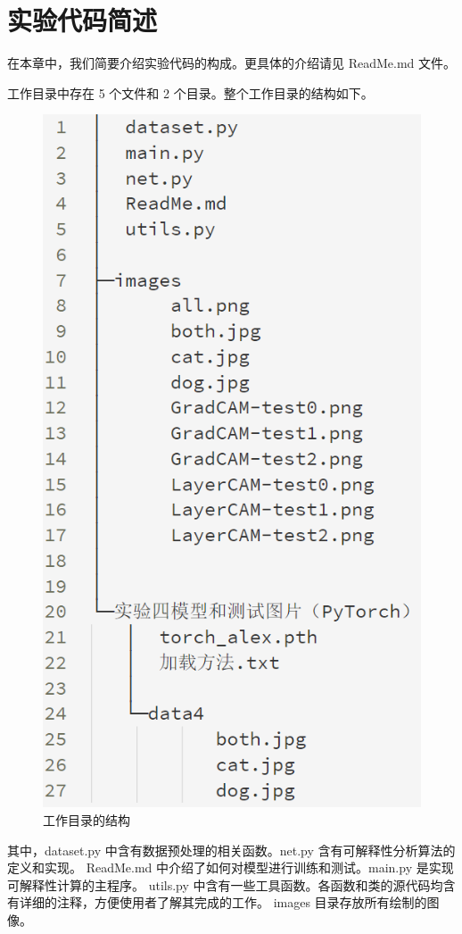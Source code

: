 \documentclass[supercite]{Experimental_Report}
\theoremstyle{definition}
\begin{document}
\section{实验代码简述}
在本章中，我们简要介绍实验代码的构成。更具体的介绍请见 ReadMe.md 文件。

工作目录中存在 5 个文件和 2 个目录。整个工作目录的结构如下。
\begin{figure}[H]
	\begin{center}
		\includegraphics[scale=0.5]{../images/tree.png}
		\caption{工作目录的结构}
	\end{center}
\end{figure}

其中，dataset.py 中含有数据预处理的相关函数。net.py 含有可解释性分析算法的定义和实现。
ReadMe.md 中介绍了如何对模型进行训练和测试。main.py 是实现可解释性计算的主程序。
utils.py 中含有一些工具函数。各函数和类的源代码均含有详细的注释，方便使用者了解其完成的工作。
images 目录存放所有绘制的图像。
\end{document}
